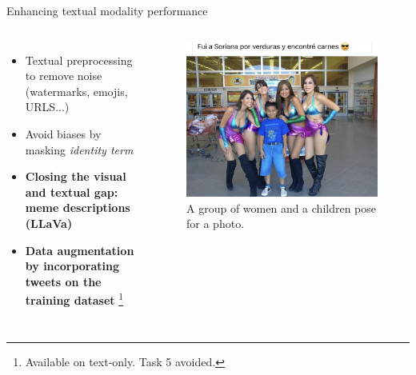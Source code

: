 \begin{frame}{Enhancing textual modality performance}
    \begin{columns}
        \centering 
        \begin{itemize}
            \item Textual preprocessing to remove noise (watermarks, emojis, URLS...)
            \item Avoid biases by masking \textit{identity term} 
            \item \textbf{Closing the visual and textual gap: meme descriptions (LLaVa)}
            \item \textbf{Data augmentation by incorporating tweets on the training dataset} \footnote{Available on text-only. Task 5 avoided.}
        \end{itemize}
        \centering
        \begin{figure}
            \includegraphics[width=\textwidth]{images/111702.jpeg}
            \caption{A group of women and a children pose for a photo.}
        \end{figure}
    \end{columns}

\end{frame}


